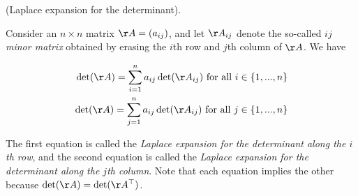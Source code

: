\begin{theorem}
    (Laplace expansion for the determinant).
    
    Consider an $n \times n$ matrix $\AA = (a_{ij})$, and let $\AA_{ij}$ denote the so-called \textit{$ij$ minor matrix} obtained by erasing the $i$th row and $j$th column of $\AA$. We have
    
    \begin{align*}
        \det(\AA) = \sum_{i = 1}^{n} a_{ij} \det(\AA_{ij}) \text{ for all $i \in \{1, ..., n\}$} \\
        \det(\AA) = \sum_{j = 1}^{n} a_{ij} \det(\AA_{ij}) \text{ for all $j \in \{1, ..., n\}$}
    \end{align*}
    
    The first equation is called the \textit{Laplace expansion for the determinant along the $i$th row}, and the second equation is called the \textit{Laplace expansion for the determinant along the $j$th column}. Note that each equation implies the other because $\det(\AA) = \det(\AA^\top)$.
\end{theorem}
    
